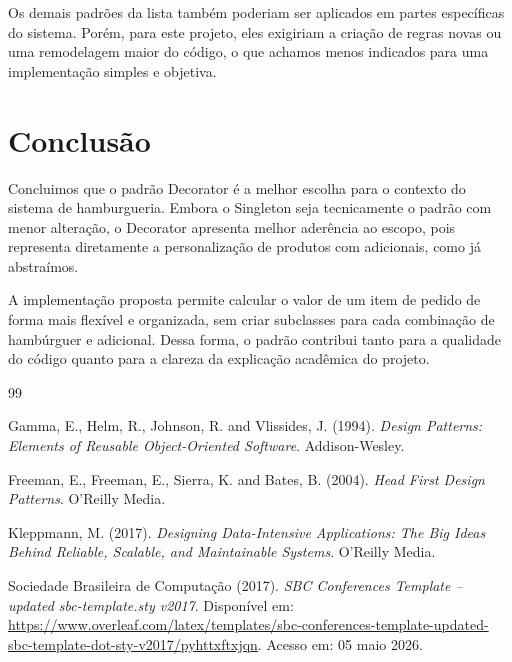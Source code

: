 \documentclass[12pt]{article}
\begin{document}
Os demais padrões da lista também poderiam ser aplicados em
partes específicas do sistema. Porém, para este projeto, eles exigiriam a
criação de regras novas ou uma remodelagem maior do código, o que achamos
menos indicados para uma implementação simples e objetiva.

\section{Conclusão}

Concluimos que o padrão Decorator é a melhor escolha para o contexto do sistema
de hamburgueria. Embora o Singleton seja tecnicamente o padrão com menor
alteração, o Decorator apresenta melhor aderência ao escopo, pois
representa diretamente a personalização de produtos com adicionais, como já abstraímos.

A implementação proposta permite calcular o valor de um item de pedido de
forma mais flexível e organizada, sem criar subclasses para cada combinação de
hambúrguer e adicional. Dessa forma, o padrão contribui tanto para a qualidade
do código quanto para a clareza da explicação acadêmica do projeto.

\renewcommand{\refname}{Referências Bibliográficas}
\begin{thebibliography}{99}

Gamma, E., Helm, R., Johnson, R. and Vlissides, J. (1994).
\newblock \textit{Design Patterns: Elements of Reusable Object-Oriented Software}.
\newblock Addison-Wesley.

Freeman, E., Freeman, E., Sierra, K. and Bates, B. (2004).
\newblock \textit{Head First Design Patterns}.
\newblock O'Reilly Media.

Kleppmann, M. (2017).
\newblock \textit{Designing Data-Intensive Applications: The Big Ideas Behind Reliable, Scalable, and Maintainable Systems}.
\newblock O'Reilly Media.

Sociedade Brasileira de Computação (2017).
\newblock \textit{SBC Conferences Template -- updated sbc-template.sty v2017}.
\newblock Disponível em:
\url{https://www.overleaf.com/latex/templates/sbc-conferences-template-updated-sbc-template-dot-sty-v2017/pyhttxftxjqn}.
\newblock Acesso em: 05 maio 2026.

\end{thebibliography}
\end{document}
